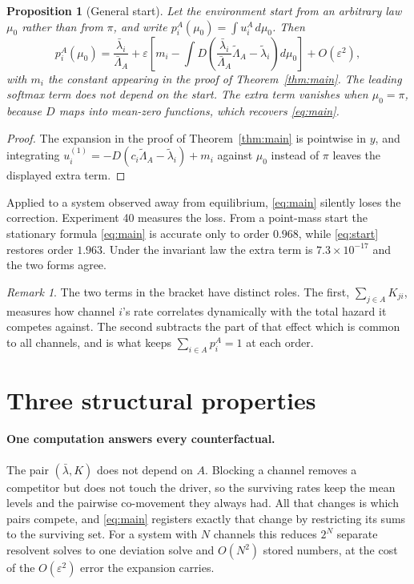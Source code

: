 \documentclass[11pt]{article}
\newtheorem{proposition}{Proposition}
\theoremstyle{remark}
\newtheorem{remark}{Remark}
\newcommand{\lbar}{\bar{\lambda}}
\begin{document}
\begin{proposition}[General start]\label{prop:start}
Let the environment start from an arbitrary law $\mu_0$ rather than from $\pi$,
and write $p_i^A(\mu_0) = \int u_i^A \, d\mu_0$. Then
\begin{equation}\label{eq:start}
  p_i^A(\mu_0) = \frac{\lbar_i}{\bar\Lambda_A}
    + \varepsilon\left[m_i
      - \int D\!\left(\frac{\lbar_i}{\bar\Lambda_A}\tilde\Lambda_A
        - \tilde\lambda_i\right) d\mu_0\right] + O(\varepsilon^2),
\end{equation}
with $m_i$ the constant appearing in the proof of Theorem~\ref{thm:main}. The
leading softmax term does not depend on the start. The extra term vanishes when
$\mu_0 = \pi$, because $D$ maps into mean-zero functions, which recovers
\eqref{eq:main}.
\end{proposition}

\begin{proof}
The expansion in the proof of Theorem~\ref{thm:main} is pointwise in $y$, and
integrating $u^{(1)}_i = -D(c_i\tilde\Lambda_A - \tilde\lambda_i) + m_i$
against $\mu_0$ instead of $\pi$ leaves the displayed extra term.
\end{proof}

Applied to a system observed away from equilibrium, \eqref{eq:main} silently
loses the correction. Experiment 40
measures the loss. From a point-mass start the stationary formula
\eqref{eq:main} is accurate only to order $0.968$, while \eqref{eq:start}
restores order $1.963$. Under the invariant law the extra term is
$7.3\times10^{-17}$ and the two forms agree.

\begin{remark}
The two terms in the bracket have distinct roles. The first,
$\sum_{j\in A}K_{ji}$, measures how channel $i$'s rate correlates dynamically
with the total hazard it competes against. The second subtracts the part of
that effect which is common to all channels, and is what keeps
$\sum_{i\in A}p_i^A = 1$ at each order.
\end{remark}

\section{Three structural properties}\label{sec:properties}

\paragraph{One computation answers every counterfactual.} The pair
$(\lbar, K)$ does not depend on $A$. Blocking a channel removes a competitor
but does not touch the driver, so the surviving rates keep the mean levels and
the pairwise co-movement they always had. All that changes is which pairs
compete, and \eqref{eq:main} registers exactly that change by restricting its
sums to the surviving set.
For a system with $N$ channels this reduces $2^N$ separate resolvent solves to
one deviation solve and $O(N^2)$ stored numbers, at the cost of the
$O(\varepsilon^2)$ error the expansion carries.
\end{document}
